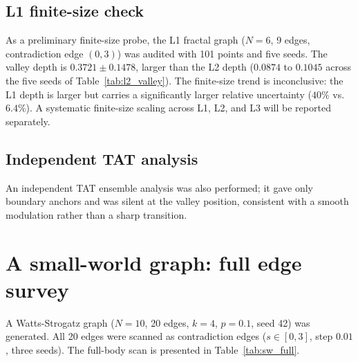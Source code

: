 \documentclass[aps,prb,reprint,superscriptaddress]{revtex4-2}
\begin{document}
\subsection{L1 finite-size check}

As a preliminary finite-size probe, the L1 fractal graph ($N=6$, 9 edges, contradiction edge $(0,3)$) was audited with 101 points and five seeds. The valley depth is $0.3721\pm0.1478$, larger than the L2 depth ($0.0874$ to $0.1045$ across the five seeds of Table~\ref{tab:l2_valley}). The finite-size trend is inconclusive: the L1 depth is larger but carries a significantly larger relative uncertainty ($40\%$ vs.\ $6.4\%$). A systematic finite-size scaling across L1, L2, and L3 will be reported separately.

\subsection{Independent TAT analysis}

An independent TAT ensemble analysis was also performed; it gave only boundary anchors and was silent at the valley position, consistent with a smooth modulation rather than a sharp transition.

\section{A small-world graph: full edge survey}

A Watts-Strogatz graph ($N=10$, 20 edges, $k=4$, $p=0.1$, seed 42) was generated. All 20 edges were scanned as contradiction edges ($s\in[0,3]$, step $0.01$, three seeds). The full-body scan is presented in Table~\ref{tab:sw_full}.
\end{document}
